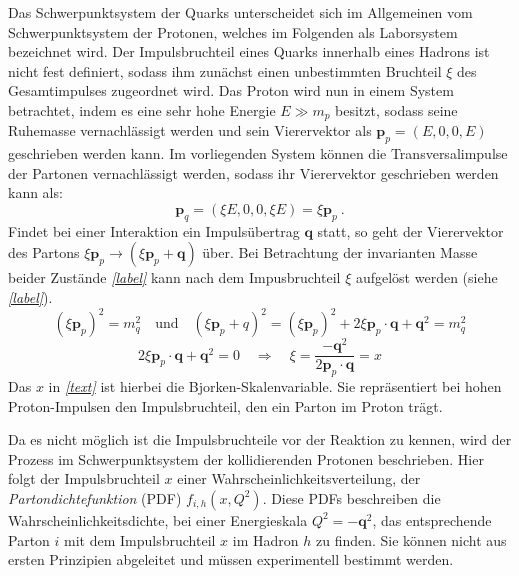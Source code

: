 Das Schwerpunktsystem der Quarks unterscheidet sich im Allgemeinen vom Schwerpunktsystem der Protonen, welches im Folgenden als Laborsystem bezeichnet wird. Der Impulsbruchteil eines Quarks innerhalb eines Hadrons ist nicht fest definiert, sodass ihm zunächst einen unbestimmten Bruchteil $\xi$ des Gesamtimpulses zugeordnet wird. Das Proton wird nun in einem System betrachtet, indem es eine sehr hohe Energie  $E \gg m_p$ besitzt, sodass seine Ruhemasse vernachlässigt werden und sein Vierervektor als $\textbf{p}_p = (E, 0, 0, E)$ geschrieben werden kann. Im vorliegenden System können die Transversalimpulse der Partonen vernachlässigt werden, sodass ihr Vierervektor geschrieben werden kann als:
\begin{equation}
\textbf{p}_q = (\xi E, 0, 0, \xi E) = \xi \textbf{p}_p ~.
\end{equation}
Findet bei einer Interaktion ein Impulsübertrag $\textbf{q}$ statt, so geht der Vierervektor des Partons $\xi \textbf{p}_p \rightarrow (\xi \textbf{p}_p + \textbf{q})$ über. Bei Betrachtung der invarianten Masse beider Zustände \textit{\autoref{label}} kann nach dem Impusbruchteil $\xi$ aufgelöst werden (siehe \textit{\autoref{label}}).
\begin{equation}
\left(\xi \textbf{p}_p\right)^2 = m_q^2 \quad \text{und} \quad \left(\xi \textbf{p}_p + q\right)^2 = \left(\xi \textbf{p}_p\right)^2 + 2\xi \textbf{p}_p \cdot \textbf{q} + \textbf{q}^2 = m_q^2
\end{equation}
\begin{equation}
2\xi \textbf{p}_p \cdot \textbf{q} + \textbf{q}^2 = 0 \quad \Rightarrow \quad \xi = \frac{-\textbf{q}^2}{2\textbf{p}_p\cdot \textbf{q}} = x
\end{equation}
Das $x$ in \textit{\autoref{text}} ist hierbei die Bjorken-Skalenvariable. Sie repräsentiert bei hohen Proton-Impulsen den Impulsbruchteil, den ein Parton im Proton trägt. 

Da es nicht möglich ist die Impulsbruchteile vor der Reaktion zu kennen, wird der Prozess im Schwerpunktsystem der kollidierenden Protonen beschrieben. Hier folgt der Impulsbruchteil $x$ einer Wahrscheinlichkeitsverteilung, der \textit{Partondichtefunktion} (PDF) $f_{i,h}(x, Q^2)$. Diese PDFs beschreiben die Wahrscheinlichkeitsdichte, bei einer Energieskala $Q^2 = -\textbf{q}^2$, das entsprechende Parton $i$ mit dem Impulsbruchteil $x$ im Hadron $h$ zu finden. Sie können nicht aus ersten Prinzipien abgeleitet und müssen experimentell bestimmt werden. 

